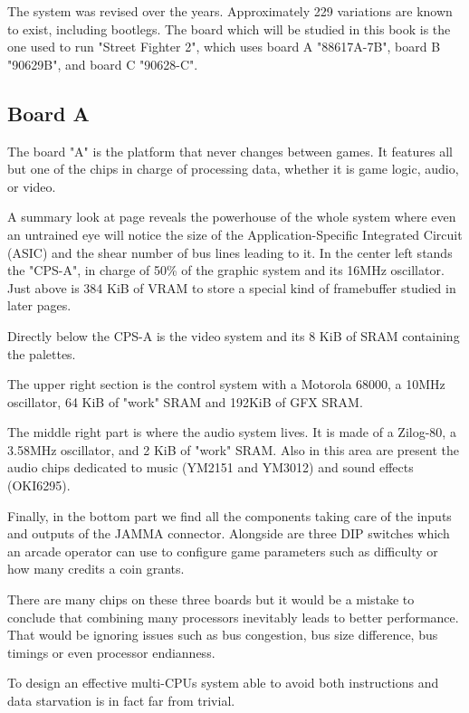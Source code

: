 The system was revised over the years. Approximately 229 variations are known to exist, including bootlegs\cite{mame_cps1_video}. The board which will be studied in this book is the one used to run "Street Fighter 2", which uses board A "88617A-7B", board B "90629B", and board C "90628-C".

\subsection{Board A}
The board "A" is the platform that never changes between games. It features all but one of the chips in charge of processing data, whether it is game logic, audio, or video.

A summary look at page \pageref{fig:boarda} reveals the powerhouse of the whole system where even an untrained eye will notice the size of the Application-Specific Integrated Circuit (ASIC) and the shear number of bus lines leading to it. In the center left stands the "CPS-A", in charge of 50\% of the graphic system and its 16MHz oscillator. Just above is 384 KiB of VRAM to store a special kind of framebuffer studied in later pages.

Directly below the CPS-A is the video system and its 8 KiB of SRAM containing the palettes.

The upper right section is the control system with a Motorola 68000, a 10MHz oscillator, 64 KiB of "work" SRAM and 192KiB of GFX SRAM. 

The middle right part is where the audio system lives. It is made of a Zilog-80, a 3.58MHz oscillator, and 2 KiB of "work" SRAM. Also in this area are present the audio chips dedicated to music (YM2151 and YM3012) and sound effects (OKI6295).

Finally, in the bottom part we find all the components taking care of the inputs and outputs of the JAMMA connector. Alongside are three DIP switches which an arcade operator can use to configure game parameters such as difficulty or how many credits a coin grants.

There are many chips on these three boards but it would be a mistake to conclude that combining many processors inevitably leads to better performance. That would be ignoring issues such as bus congestion, bus size difference, bus timings or even processor endianness. 

To design an effective multi-CPUs system able to avoid both instructions and data starvation is in fact far from trivial.


